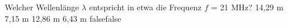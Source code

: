     {Welcher Wellenlänge $\lambda$ entspricht in etwa die Frequenz $f$ = 21 MHz?}
    {14,29 m}
    {7,15 m}
    {12,86 m}
    {6,43 m}
    {false}{false}